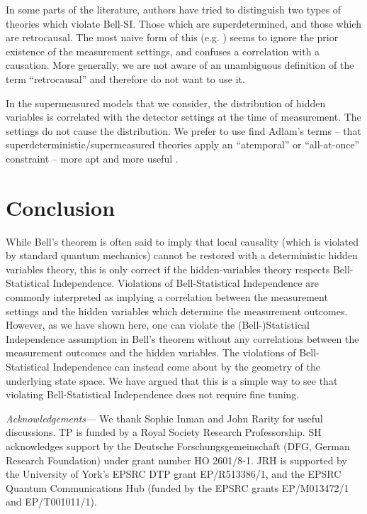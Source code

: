 \documentclass[12pt]{article}
\begin{document}
In some parts of the literature, authors have tried to distinguish two types of theories which violate Bell-SI. Those which are superdetermined, and those which are retrocausal. The most naive form of this (e.g. \mbox{\cite{sen2022analysis}}) seems to ignore the prior existence of the measurement settings, and confuses a correlation with a causation. More generally, we are not aware of an unambiguous definition of the term ``retrocausal'' and therefore do not want to use it.

In the supermeasured models that we consider, the distribution of hidden variables is correlated with the detector settings at the time of measurement. The settings do not cause the distribution. We prefer to use  find Adlam's terms -- that superdeterministic/supermeasured theories apply an ``atemporal'' or ``all-at-once'' constraint -- more apt and more useful \mbox{\cite{adlam2022two}}.
 

\section{Conclusion}

While Bell's theorem is often said to imply that local causality (which is violated by standard quantum mechanics) cannot be restored with a deterministic hidden variables theory, this is only correct if the hidden-variables theory respects Bell-Statistical Independence. Violations of Bell-Statistical Independence are commonly interpreted as implying a correlation between the measurement settings and the hidden variables which determine the measurement outcomes. However, as we have shown here, one can violate the (Bell-)Statistical Independence assumption in Bell's theorem without any correlations between the measurement outcomes and the hidden variables. The violations of Bell-Statistical Independence can instead come about by the geometry of the underlying state space. We have argued that this is a simple way to see that violating Bell-Statistical Independence does not require fine tuning.

\bigskip

\textit{Acknowledgements---}
We thank Sophie Inman and John Rarity for useful discussions. TP is funded by a Royal Society Research Professorship. SH acknowledges support by the Deutsche Forschungsgemeinschaft (DFG, German Research Foundation) under grant number HO 2601/8-1. JRH is supported by the University of York's EPSRC DTP grant EP/R513386/1, and the EPSRC Quantum Communications Hub (funded by the EPSRC grants EP/M013472/1 and EP/T001011/1).

\newpage


\raggedright


\end{document}

